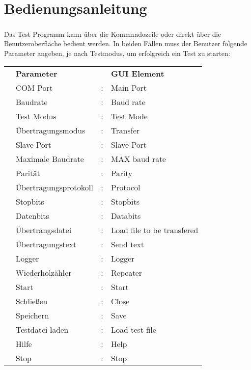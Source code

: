 \chapter{Bedienungsanleitung}\label{chp:bedienungsanleitung}


\paragraph{}
Das Test Programm kann über die Kommnadozeile oder direkt über die Benutzeroberfläche bedient werden. In beiden Fällen muss der Benutzer folgende Parameter angeben, je nach Testmodus, um erfolgreich ein Test zu starten:
\\
\begin{tabular}{llll}
\\ &\textbf{Parameter} & &\textbf{GUI Element}
\\ &COM Port &: &Main Port
\\ &Baudrate &: &Baud rate
\\ &Test Modus &: &Test Mode
\\ &Übertragungsmodus &: &Transfer
\\ &Slave Port &: &Slave Port
\\ &Maximale Baudrate &: &MAX baud rate
\\ &Parität &: &Parity
\\ &Übertragungsprotokoll &: &Protocol
\\ &Stopbits &: &Stopbits
\\ &Datenbits &: &Databits
\\ &Übertrangsdatei &: &Load file to be transfered
\\ &Übertragungstext &: &Send text
\\ &Logger &: &Logger
\\ &Wiederholzähler &: &Repeater
\\ &Start &: &Start
\\ &Schließen &: &Close
\\ &Speichern &: &Save
\\ &Testdatei laden &: &Load test file
\\ &Hilfe &: &Help
\\ &Stop &: &Stop
\end{tabular}


